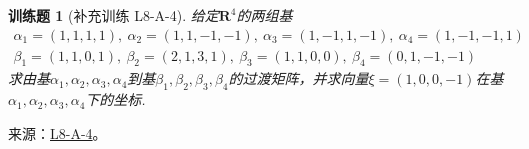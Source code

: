 \documentclass[12pt,fontset=fandol]{ctexart}
\newtheorem{exercise}{训练题}[section]
\begin{document}
\begin{exercise}[补充训练 L8-A-4]\label{prob:L8-A-4}
给定$\mathbf{R}^4$的两组基
        \begin{gather*}
            \alpha_1=(1,1,1,1),\ \alpha_2=(1,1,-1,-1),\ \alpha_3=(1,-1,1,-1),\ \alpha_4=(1,-1,-1,1) \\
            \beta_1=(1,1,0,1),\ \beta_2=(2,1,3,1),\ \beta_3=(1,1,0,0),\ \beta_4=(0,1,-1,-1)
        \end{gather*}
        求由基$\alpha_1,\alpha_2,\alpha_3,\alpha_4$到基$\beta_1,\beta_2,\beta_3,\beta_4$的过渡矩阵，并求向量$\xi=(1,0,0,-1)$在基$\alpha_1,\alpha_2,\alpha_3,\alpha_4$下的坐标.
\end{exercise}
\noindent 来源：\href{https://github.com/yhwu-is/Linear-Algebra-Left-Undone/blob/new/%E8%AE%B2%E4%B9%89/%E4%B8%93%E9%A2%98/8%20%E7%9B%B8%E6%8A%B5%E6%A0%87%E5%87%86%E5%BD%A2.tex}{L8-A-4}。
\end{document}
